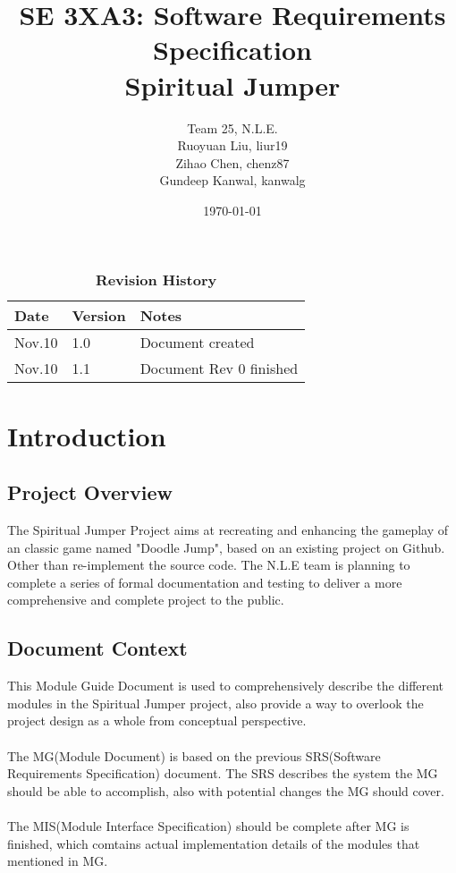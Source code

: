 \documentclass[12pt, titlepage]{article}
\title{SE 3XA3: Software Requirements Specification\\Spiritual Jumper}
\author{Team 25, N.L.E.
		\\ Ruoyuan Liu, liur19
		\\ Zihao Chen, chenz87
		\\ Gundeep Kanwal, kanwalg
}
\date{\today}
\begin{document}
\maketitle
{}
\tableofcontents
\listoftables
\listoffigures


\begin{table}[bp]
\caption{\bf Revision History}
\begin{tabularx}{\textwidth}{p{3cm}p{2cm}X}
\toprule {\bf Date} & {\bf Version} & {\bf Notes}\\
\midrule
Nov.10 & 1.0 & Document created\\
Nov.10 & 1.1 & Document Rev 0 finished\\
\bottomrule
\end{tabularx}
\end{table}

\newpage
\newpage

\section{Introduction}\label{SecIntro}
\subsection{Project Overview}
The Spiritual Jumper Project aims at recreating and enhancing the gameplay of an classic game named "Doodle Jump", based on an existing project on Github. Other than re-implement the source code. The N.L.E team is planning to complete a series of formal documentation and testing to deliver a more comprehensive and complete project to the public.
\subsection{Document Context}
This Module Guide Document is used to comprehensively describe the different modules in the Spiritual Jumper project, also provide a way to overlook the project design as a whole from conceptual perspective.\\\\
The MG(Module Document) is based on the previous SRS(Software Requirements Specification) document. The SRS describes the system the MG should be able to accomplish, also with potential changes the MG should cover.\\\\
The MIS(Module Interface Specification) should be complete after MG is finished, which comtains actual implementation details of the modules that mentioned in MG.
\end{document}

